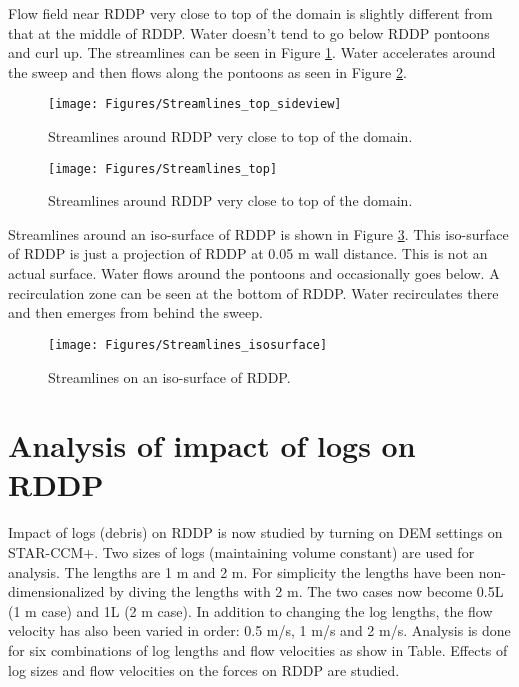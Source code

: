 \noindent Flow field near RDDP very close to top of the domain is slightly different from that at the middle of RDDP. Water doesn't tend to go below RDDP pontoons and curl up. The streamlines can be seen in Figure \ref{fig:Streamlines_top_sideview}. Water accelerates around the sweep and then flows along the pontoons as seen in Figure \ref{fig:Streamlines_top}. 

\begin{figure}
\centering
\texttt{[image: Figures/Streamlines\_top\_sideview]}
\caption{\label{fig:Streamlines_top_sideview}Streamlines around RDDP very close to top of the domain.}
\end{figure}

\begin{figure}
\centering
\texttt{[image: Figures/Streamlines\_top]}
\caption{\label{fig:Streamlines_top}Streamlines around RDDP very close to top of the domain.}
\end{figure}

\noindent Streamlines around an iso-surface of RDDP is shown in Figure \ref{fig:Streamlines_isosurface}. This iso-surface of RDDP is just a projection of RDDP at 0.05 m wall distance. This is not an actual surface. Water flows around the pontoons and occasionally goes below. A recirculation zone can be seen at the bottom of RDDP. Water recirculates there and then emerges from behind the sweep.\\

\begin{figure}
\centering
\texttt{[image: Figures/Streamlines\_isosurface]}
\caption{\label{fig:Streamlines_isosurface}Streamlines on an iso-surface of RDDP.}
\end{figure} 

\newpage
\FloatBarrier
\section{Analysis of impact of logs on RDDP}
Impact of logs (debris) on RDDP is now studied by turning on DEM settings on STAR-CCM+. Two sizes of logs (maintaining volume constant) are used for analysis. The lengths are 1 m and 2 m. For simplicity the lengths have been non-dimensionalized by diving the lengths with 2 m. The two cases now become 0.5L (1 m case) and 1L (2 m case). In addition to changing the log lengths, the flow velocity has also been varied in order: 0.5 m/s, 1 m/s and 2 m/s. Analysis is done for six combinations of log lengths and flow velocities as show in Table. Effects of log sizes and flow velocities on the forces on RDDP are studied.

